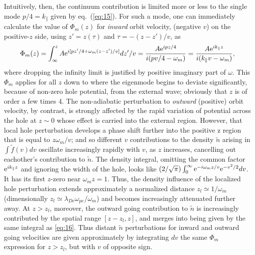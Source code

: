 \documentclass[12pt]{article}
\def\etothe#1{{\rm e}^{#1}}
\begin{document}
Intuitively, then, the continuum contribution is limited more or less
to the single mode
$p/4=k_\parallel$ given by eq.\ (\ref{eq:15}).
For such a mode, one can immediately calculate the value of
$\Phi_m(z)$ for \emph{inward} orbit velocity, (negative $v$) on the
positive-$z$ side, using $z'=z(\tau)$ and $\tau=-(z-z')/v$, as
\begin{equation}
  \label{eq:16}
  \Phi_m(z) = \int_{\infty}^zA{\rm e}^{i[pz'/4+\omega_m
    (z-z')/v]}dz'/v
  ={A{\rm e}^{ipz/4} \over i(pv/4-\omega_m)}={A{\rm e}^{ik_\parallel z} \over
    i(k_\parallel v-\omega_m)},
\end{equation}
where dropping the infinity limit is justified by positive imaginary
part of $\omega$.  This $\Phi_m$ applies for all $z$ down to where the
eigenmode begins to deviate significantly, because of non-zero hole
potential, from the external wave; obviously that $z$ is of order a
few times 4. The non-adiabatic perturbation to \emph{outward}
(positive) orbit velocity, by contrast, is strongly affected by the
rapid variation of potential across the hole at $z\sim 0$ whose effect
is carried into the external region. However, that local hole
perturbation develops a phase shift further into the positive z region
that is equal to $z\omega_m/v$; and so different $v$ contributions to
the density $\tilde n$ arising in $\int \tilde f(v) dv$ oscillate
increasingly rapidly with $v$, as $z$ increases, cancelling out
eachother's contribution to $\tilde n$. The density integral, omitting the
common factor $\etothe{ik_\parallel z}$ and ignoring the width of the
hole, looks like
$(2/\sqrt{\pi})\int_0^\infty \etothe{-i\omega_m
  z/v}\etothe{-v^2/2}dv$.  It has its first $z$-zero near
$\omega_m z=1$. Thus, the density influence of the localized hole
perturbation extends approximately a normalized distance
$z_l\simeq 1/\omega_m$ (dimensionally
$z_l\simeq \lambda_{De}\omega_{pe}/\omega_m$) and becomes increasingly
attenuated further away. At $z>z_l$, moreover, the outward going
contribution to $\tilde n$ is increasingly contributed by the spatial
range $[z-z_l,z]$, and merges into being given by the same integral as
\ref{eq:16}.  Thus distant $\tilde n$ perturbations for inward and
outward going velocities are given approximately by integrating $dv$
the same $\Phi_m$ expression for $z>z_l$, but with $v$ of opposite
sign.
\end{document}
